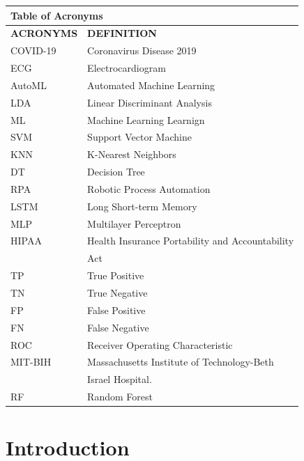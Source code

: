 \documentclass[a4paper,fleqn]{cas-dc}
\begin{document}
\maketitle

\begin{table}
    \begin{tabular*}{\tblwidth}{@{}ll@{}}
        \multicolumn{2}{l}{\bfseries Table of Acronyms} \\
        \toprule
        \textbf{ACRONYMS} & \textbf{DEFINITION} \\
        \midrule
        COVID-19 & Coronavirus Disease 2019 \\
        ECG & Electrocardiogram \\
        AutoML & Automated Machine Learning \\
        LDA & Linear Discriminant Analysis \\
        ML & Machine Learning Learnign \\
        SVM & Support Vector Machine \\
        KNN & K-Nearest Neighbors \\
        DT & Decision Tree \\
        RPA & Robotic Process Automation \\
        LSTM & Long Short-term Memory \\
        MLP & Multilayer Perceptron \\
        HIPAA & Health Insurance Portability and Accountability \\
        & Act \\
        TP & True Positive \\
        TN & True Negative \\
        FP & False Positive \\
        FN & False Negative \\
        ROC & Receiver Operating Characteristic \\
        MIT-BIH & Massachusetts Institute of Technology-Beth \\
        & Israel Hospital.\\
        RF & Random Forest \\
        \bottomrule
    \end{tabular*}
\end{table}

\FloatBarrier
\section{Introduction} \label{sec:introduction}
\end{document}
